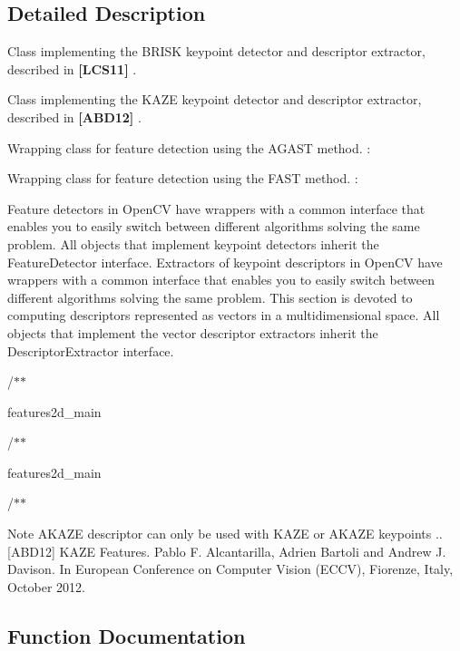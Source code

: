 \subsection{Detailed Description}
Class implementing the B\+R\+I\+SK keypoint detector and descriptor extractor, described in {\bfseries [L\+C\+S11]} . 

Class implementing the K\+A\+ZE keypoint detector and descriptor extractor, described in {\bfseries [A\+B\+D12]} .

Wrapping class for feature detection using the A\+G\+A\+ST method. \+:

Wrapping class for feature detection using the F\+A\+ST method. \+:

Feature detectors in Open\+CV have wrappers with a common interface that enables you to easily switch between different algorithms solving the same problem. All objects that implement keypoint detectors inherit the Feature\+Detector interface. Extractors of keypoint descriptors in Open\+CV have wrappers with a common interface that enables you to easily switch between different algorithms solving the same problem. This section is devoted to computing descriptors represented as vectors in a multidimensional space. All objects that implement the vector descriptor extractors inherit the Descriptor\+Extractor interface.

/$\ast$$\ast$

features2d\+\_\+main 

/$\ast$$\ast$

features2d\+\_\+main 

/$\ast$$\ast$

\begin{DoxyNote}{Note}
A\+K\+A\+ZE descriptor can only be used with K\+A\+ZE or A\+K\+A\+ZE keypoints .. \mbox{[}A\+B\+D12\mbox{]} K\+A\+ZE Features. Pablo F. Alcantarilla, Adrien Bartoli and Andrew J. Davison. In European Conference on Computer Vision (E\+C\+CV), Fiorenze, Italy, October 2012. 
\end{DoxyNote}


\subsection{Function Documentation}
\mbox{\label{group__features2d__main_ga849ee8acfb310ef13c3fd8a8f25327ed}} 
